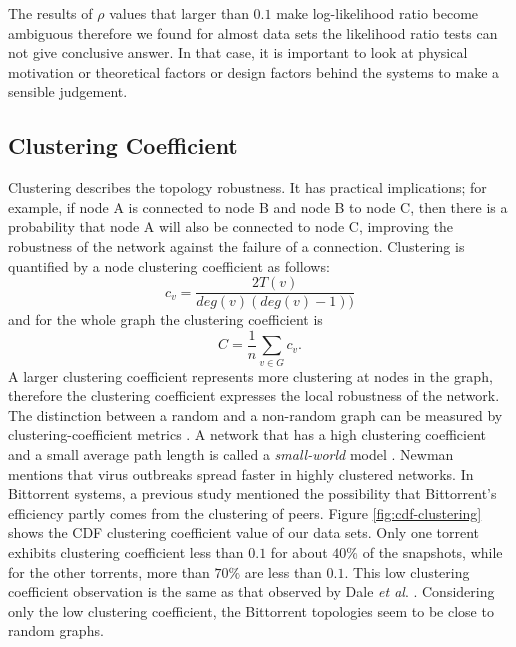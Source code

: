 \documentclass[paper]{ieice}
\begin{document}
The results of $\rho$ values that larger than $0.1$ make log-likelihood ratio become ambiguous therefore
we found for almost data sets the likelihood ratio tests can not give conclusive answer. 
In that case, it is important to look at physical motivation or theoretical factors or design factors behind the systems to make a sensible judgement. 



\subsection{Clustering Coefficient}\label{clusteringcoef}

Clustering describes the topology robustness. 
It has practical implications; for example, if node A is connected to node B and node B to node C, then there is a probability that node A will also be
connected to node C, improving the robustness of the network against the failure of a connection.  
Clustering is quantified by a node clustering coefficient as follows:
\begin{equation}
c_v = \frac{2T(v)}{deg(v) (deg(v)-1))}
\end{equation} 
and for the whole graph the clustering coefficient is
\begin{equation}
C = \frac{1}{n} \sum_{v \in G} c_v.
\end{equation}
A larger clustering coefficient represents more clustering at nodes in the graph, therefore the clustering coefficient expresses the local robustness of the network.
The distinction between a random and a non-random graph can be measured by clustering-coefficient metrics \cite{watts1998collective}.
A network that has a high clustering coefficient and a small average path length is called a \textit{small-world} model \cite{watts1998collective}.
Newman \cite{newman2003properties} mentions that virus outbreaks spread faster in highly clustered networks. 
In Bittorrent systems, a previous study \cite{legout2007clustering} mentioned the possibility that Bittorrent's efficiency partly comes from the clustering of peers.
Figure \ref{fig:cdf-clustering} shows the CDF clustering coefficient value of our data sets.
Only one torrent exhibits clustering coefficient less than $0.1$ for about $40\%$ of the snapshots, while for the other torrents, more than  $70\%$ are less than $0.1$.
This low clustering coefficient observation is the same as that observed by Dale \textit{et al}. \cite{dale2008evolution}.
Considering only the low clustering coefficient, the Bittorrent topologies seem to be close to random graphs.
\end{document}
